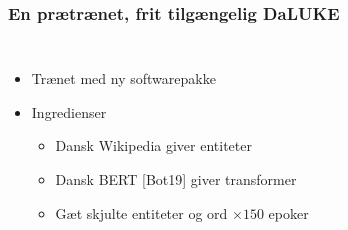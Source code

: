\documentclass{beamer}
\begin{document}
\begin{frame}
    \frametitle{En prætrænet, frit tilgængelig DaLUKE}
    \begin{columns}
        \begin{itemize}
            \item Trænet med ny softwarepakke
            \item Ingredienser
                \begin{itemize}
                    \item Dansk Wikipedia giver entiteter
                    \item Dansk BERT [Bot19] giver transformer
                    \item Gæt skjulte entiteter og ord $\times 150$ epoker
                \end{itemize}
        \end{itemize}

        \begin{figure}[H]
            \centering
            
        \end{figure}\noindent
        \vspace{-1cm}
        \begin{example}
            \footnotesize
            \begin{overlayarea}{\textwidth}{1cm}
            \end{overlayarea}
        \end{example}
    \end{columns}
\end{frame}
\end{document}
